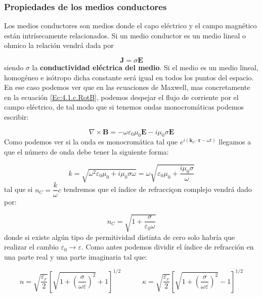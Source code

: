 \documentclass[12pt]{article}
\newcommand{\parentesis}[1]{\left( #1  \right)}
\newcommand{\ccorchetes}[1]{\left[ #1  \right]}
\newcommand{\tquad}{\quad \quad \quad}
\newcommand{\rota}{\nabla \times}
\newcommand{\Bn}{\mathbf{B}}
\newcommand{\En}{\mathbf{E}}
\newcommand{\Jn}{\mathbf{J}}
\newcommand{\kn}{\mathbf{k}}
\newcommand{\rn}{\mathbf{r}}
\numberwithin{equation}{section}
\numberwithin{figure}{section}
\begin{document}
\subsubsection{Propiedades de los medios conductores}

Los medios conductores son medios donde el capo eléctrico y el campo magnético están intrísecamente relacionados. Si un medio conductor es un medio lineal o ohmico la relación vendrá dada por

\begin{equation}
\Jn = \sigma \En
\end{equation}
siendo $\sigma$ la \textbf{conductividad eléctrica del medio}. Si el medio es un medio lineal, homogéneo e isótropo dicha constante será igual en todos los puntos del espacio. En ese caso podemos ver que en las ecuaciones de Maxwell, mas concretamente en la ecuación \ref{Ec:4.1.c.RotB}, podemos despejar el flujo de corriente por el campo eléctrico, de tal modo que si tenemos ondas monocromáticas podemos escribir:

\begin{equation}
\rota \Bn = - \omega \varepsilon_0 \mu_0 \En  - i \mu_0 \sigma \En
\end{equation}
Como podemos ver si la onda es monocromática tal que $e^{i (\kn_C  \cdot \rn - \omega t)}$ llegamos a que el número de onda debe tener la siguiente forma:

\begin{equation}
k = \sqrt{\omega^2 \varepsilon_0 \mu_0 + i \mu_0 \sigma \omega} = \omega \sqrt{\varepsilon_0 \mu_0 + \frac{i \mu_0 \sigma }{\omega}}
\end{equation}
tal que si $n_C = \dfrac{k}{\omega} c$ tendremos que el índice de refracciçon complejo vendrá dado por:

\begin{equation}
n_C = \sqrt{1+\dfrac{\sigma}{\varepsilon_0 \omega}}
\end{equation}
donde si existe algún tipo de permitividad distinta de cero solo habría que realizar el cambio $\varepsilon_0 \rightarrow \varepsilon$. Como antes podemos dividir el índice de refracción en una parte real y una parte imaginaria tal que:

\begin{equation}
n = \sqrt{\dfrac{\varepsilon_r}{2}} \ccorchetes{\sqrt{1+\parentesis{\dfrac{\sigma}{\omega \varepsilon}}^2} + 1}^{1/2} \tquad \kappa = \sqrt{\dfrac{\varepsilon_r}{2}} \ccorchetes{\sqrt{1+\parentesis{\dfrac{\sigma}{\omega \varepsilon}}^2} - 1}^{1/2}
\end{equation}
\end{document}

